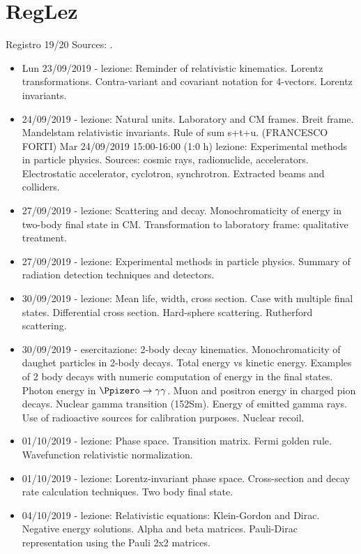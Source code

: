 \section{RegLez}

\begin{frame}[allowframebreaks]{Registro 19/20}
Sources: \cite{reg19}.
\begin{itemize}
\item Lun 23/09/2019 - lezione: Reminder of relativistic kinematics. Lorentz transformations. Contra-variant and covariant notation for 4-vectors. Lorentz invariants.
\item 24/09/2019 - lezione: Natural units. Laboratory and CM frames. Breit frame. Mandelstam relativistic invariants. Rule of sum s+t+u. (FRANCESCO FORTI)
Mar 24/09/2019 15:00-16:00 (1:0 h) lezione: Experimental methods in particle physics. Sources: cosmic rays, radionuclide, accelerators. Electrostatic accelerator, cyclotron, synchrotron. Extracted beams and colliders.
\item 27/09/2019 - lezione: Scattering and decay. Monochromaticity of energy in two-body final state in CM. Transformation to laboratory frame: qualitative treatment.
\item 27/09/2019 - lezione: Experimental methods in particle physics. Summary of radiation detection techniques and detectors.
\item 30/09/2019 - lezione: Mean life, width, cross section. Case with multiple final states. Differential cross section. Hard-sphere scattering. Rutherford scattering.
\item 30/09/2019 - esercitazione: 2-body decay kinematics. Monochromaticity of daughet particles in 2-body decays. Total energy vs kinetic energy. Examples of 2 body decays with numeric computation of energy in the final states. Photon energy in $\Ppizero\to\gamma\gamma$. Muon and positron energy in charged pion decays. Nuclear gamma transition (152Sm). Energy of emitted gamma rays. Use of radioactive sources for calibration purposes. Nuclear recoil.
\item 01/10/2019 - lezione: Phase space. Transition matrix. Fermi golden rule. Wavefunction relativistic normalization.
\item 01/10/2019 - lezione: Lorentz-invariant phase space. Cross-section and decay rate calculation techniques. Two body final state.
\item 04/10/2019 - lezione: Relativistic equations: Klein-Gordon and Dirac. Negative energy solutions. Alpha and beta matrices. Pauli-Dirac representation using the Pauli 2x2 matrices.

\end{itemize}
\end{frame}
